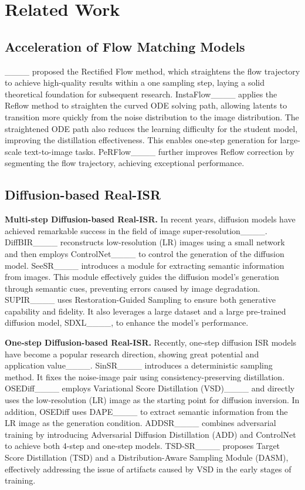 \section{Related Work}
\vspace{-1mm}
\subsection{Acceleration of Flow Matching Models} 
\vspace{-1mm}
____ proposed the Rectified Flow method, which straightens the flow trajectory to achieve high-quality results within a one sampling step, laying a solid theoretical foundation for subsequent research. InstaFlow____ applies the Reflow method to straighten the curved ODE solving path, allowing latents to transition more quickly from the noise distribution to the image distribution. The straightened ODE path also reduces the learning difficulty for the student model, improving the distillation effectiveness. This enables one-step generation for large-scale text-to-image tasks. PeRFlow____ further improves Reflow correction by segmenting the flow trajectory, achieving exceptional performance. 

\vspace{-2mm}
\subsection{Diffusion-based Real-ISR}
\vspace{-1mm}
\textbf{Multi-step Diffusion-based Real-ISR.} In recent years, diffusion models have achieved remarkable success in the field of image super-resolution____. DiffBIR____ reconstructs low-resolution (LR) images using a small network and then employs ControlNet____ to control the generation of the diffusion model. SeeSR____ introduces a module for extracting semantic information from images. This module effectively guides the diffusion model's generation through semantic cues, preventing errors caused by image degradation. SUPIR____ uses Restoration-Guided Sampling to ensure both generative capability and fidelity. It also leverages a large dataset and a large pre-trained diffusion model, SDXL____, to enhance the model's performance.

\textbf{One-step Diffusion-based Real-ISR.} Recently, one-step diffusion ISR models have become a popular research direction, showing great potential and application value____. SinSR____ introduces a deterministic sampling method. It fixes the noise-image pair using consistency-preserving distillation. OSEDiff____ employs Variational Score Distillation (VSD)____ and directly uses the low-resolution (LR) image as the starting point for diffusion inversion. In addition, OSEDiff uses DAPE____ to extract semantic information from the LR image as the generation condition. ADDSR____ combines adversarial training by introducing Adversarial Diffusion Distillation (ADD) and ControlNet to achieve both 4-step and one-step models. TSD-SR____ proposes Target Score Distillation (TSD) and a Distribution-Aware Sampling Module (DASM), effectively addressing the issue of artifacts caused by VSD in the early stages of training.